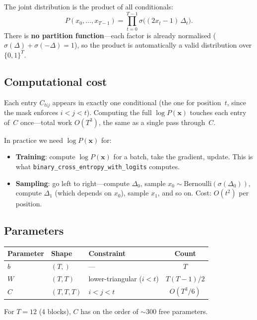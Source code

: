 \documentclass[11pt]{article}
\begin{document}
The joint distribution is the product of all conditionals:
\begin{equation}\label{eq:joint}
  P(x_0, \ldots, x_{T-1})
  = \prod_{t=0}^{T-1} \sigma\bigl((2x_t - 1)\,\Delta_t\bigr).
\end{equation}
There is \textbf{no partition function}---each factor is already
normalised ($\sigma(\Delta) + \sigma(-\Delta) = 1$), so the product is
automatically a valid distribution over $\{0,1\}^T$.

\subsection{Computational cost}

Each entry $C_{tij}$ appears in exactly one conditional (the one for
position~$t$, since the mask enforces $i < j < t$).  Computing the full
$\log P(\mathbf{x})$ touches each entry of~$C$ once---total work
$O(T^3)$, the same as a single pass through~$C$.

In practice we need $\log P(\mathbf{x})$ for:
\begin{itemize}
  \item \textbf{Training}: compute $\log P(\mathbf{x})$ for a batch,
        take the gradient, update.  This is what
        \texttt{binary\_cross\_entropy\_with\_logits} computes.
  \item \textbf{Sampling}: go left to right---compute $\Delta_0$,
        sample $x_0 \sim \mathrm{Bernoulli}(\sigma(\Delta_0))$, compute
        $\Delta_1$ (which depends on $x_0$), sample $x_1$, and so on.
        Cost: $O(t^2)$ per position.
\end{itemize}

\subsection{Parameters}

\begin{center}
\begin{tabular}{lllc}
\toprule
Parameter & Shape & Constraint & Count \\
\midrule
$b$       & $(T,)$       & ---              & $T$ \\
$W$       & $(T, T)$     & lower-triangular ($i < t$) & $T(T-1)/2$ \\
$C$       & $(T, T, T)$  & $i < j < t$      & $O(T^3/6)$ \\
\bottomrule
\end{tabular}
\end{center}
For $T = 12$ (4 blocks), $C$ has on the order of $\sim$300 free
parameters.
\end{document}
